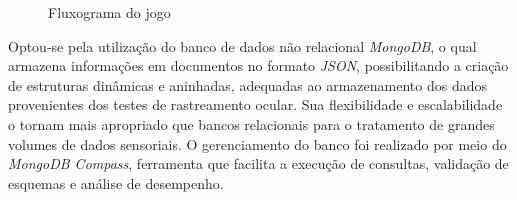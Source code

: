 \begin{figure}[H]
    \centering
    \caption{Fluxograma do jogo}%
    \label{fig:fluxograma-jogo}
\end{figure}

Optou-se pela utilização do banco de dados não relacional \textit{MongoDB}, o qual armazena informações em documentos no formato \textit{JSON}, possibilitando a criação de estruturas dinâmicas e aninhadas, adequadas ao armazenamento dos dados provenientes dos testes de rastreamento ocular. Sua flexibilidade e escalabilidade o tornam mais apropriado que bancos relacionais para o tratamento de grandes volumes de dados sensoriais. O gerenciamento do banco foi realizado por meio do \textit{MongoDB Compass}, ferramenta que facilita a execução de consultas, validação de esquemas e análise de desempenho.
